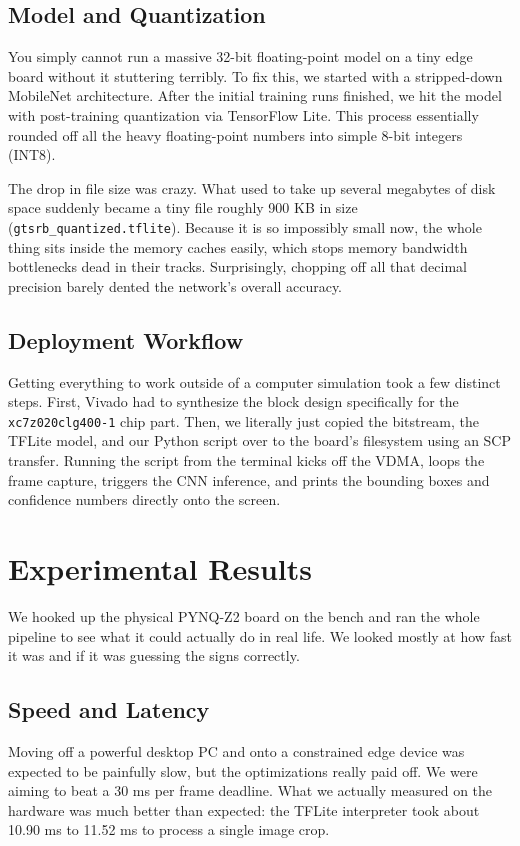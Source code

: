 \documentclass[conference]{IEEEtran}
\begin{document}
\subsection{Model and Quantization}
You simply cannot run a massive 32-bit floating-point model on a tiny edge board without it stuttering terribly. To fix this, we started with a stripped-down MobileNet architecture. After the initial training runs finished, we hit the model with post-training quantization via TensorFlow Lite. This process essentially rounded off all the heavy floating-point numbers into simple 8-bit integers (INT8). 

The drop in file size was crazy. What used to take up several megabytes of disk space suddenly became a tiny file roughly 900 KB in size (\texttt{gtsrb\_quantized.tflite}). Because it is so impossibly small now, the whole thing sits inside the memory caches easily, which stops memory bandwidth bottlenecks dead in their tracks. Surprisingly, chopping off all that decimal precision barely dented the network's overall accuracy.

\subsection{Deployment Workflow}
Getting everything to work outside of a computer simulation took a few distinct steps. First, Vivado had to synthesize the block design specifically for the \texttt{xc7z020clg400-1} chip part. Then, we literally just copied the bitstream, the TFLite model, and our Python script over to the board's filesystem using an SCP transfer. Running the script from the terminal kicks off the VDMA, loops the frame capture, triggers the CNN inference, and prints the bounding boxes and confidence numbers directly onto the screen.

\section{Experimental Results}
We hooked up the physical PYNQ-Z2 board on the bench and ran the whole pipeline to see what it could actually do in real life. We looked mostly at how fast it was and if it was guessing the signs correctly.

\subsection{Speed and Latency}
Moving off a powerful desktop PC and onto a constrained edge device was expected to be painfully slow, but the optimizations really paid off. We were aiming to beat a 30 ms per frame deadline. What we actually measured on the hardware was much better than expected: the TFLite interpreter took about 10.90 ms to 11.52 ms to process a single image crop. 
\end{document}
